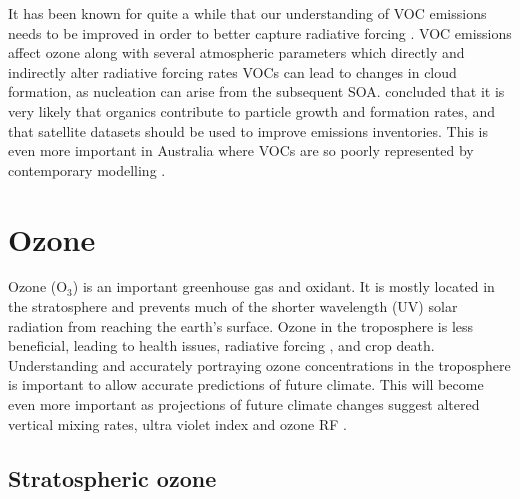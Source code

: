     It has been known for quite a while that our understanding of VOC emissions needs to be improved in order to better capture radiative forcing \parencite{Kanakidou2005}.
    VOC emissions affect ozone along with several atmospheric parameters which directly and indirectly alter radiative forcing rates \parencite[eg.][]{Arneth2008}
    VOCs can lead to changes in cloud formation, as nucleation can arise from the subsequent SOA.
    \textcite{Kanakidou2005} concluded that it is very likely that organics contribute to particle growth and formation rates, and that satellite datasets should be used to improve emissions inventories.
    This is even more important in Australia where VOCs are so poorly represented by contemporary modelling \parencite{Emmerson2016}.

\section{Ozone}
\label{LR:O3}
  
  Ozone (O$_3$) is an important greenhouse gas and oxidant.
  It is mostly located in the stratosphere and prevents much of the shorter wavelength (UV) solar radiation from reaching the earth's surface.
  Ozone in the troposphere is less beneficial, leading to health issues, radiative forcing \parencite{Stevenson2013}, and crop death.
  Understanding and accurately portraying ozone concentrations in the troposphere is important to allow accurate predictions of future climate.
  This will become even more important as projections of future climate changes suggest altered vertical mixing rates, ultra violet index and ozone RF \parencite{Hegglin2009}.
  
  \subsection{Stratospheric ozone}
  
